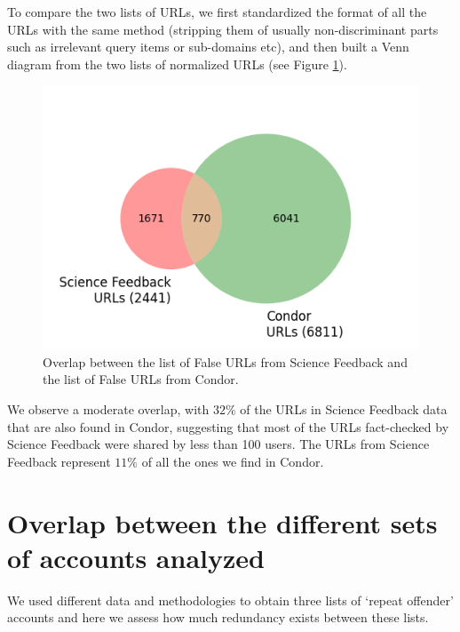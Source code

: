 \documentclass[review]{elsarticle}
\begin{document}
To compare the two lists of URLs, we first standardized the format of all the URLs with the same method (stripping them of usually non-discriminant parts such as irrelevant query items or sub-domains etc), and then built a Venn diagram from the two lists of normalized URLs (see Figure \ref{venn_urls}). 

\begin{figure}[!h]
\centering
\includegraphics[scale=0.5]{./../figure/supplementary_venn_urls.png}
\caption{
Overlap between the list of False URLs from Science Feedback and the list of False URLs from Condor.
}
\label{venn_urls}
\end{figure}

We observe a moderate overlap, with $32\%$ of the URLs in Science Feedback data that are also found in Condor, suggesting that most of the URLs fact-checked by Science Feedback were shared by less than 100 users. 
The URLs from Science Feedback represent $11\%$ of all the ones we find in Condor.

\section*{Overlap between the different sets of accounts analyzed}

We used different data and methodologies to obtain three lists of `repeat offender' accounts and here we assess how much redundancy exists between these lists. 
\end{document}
